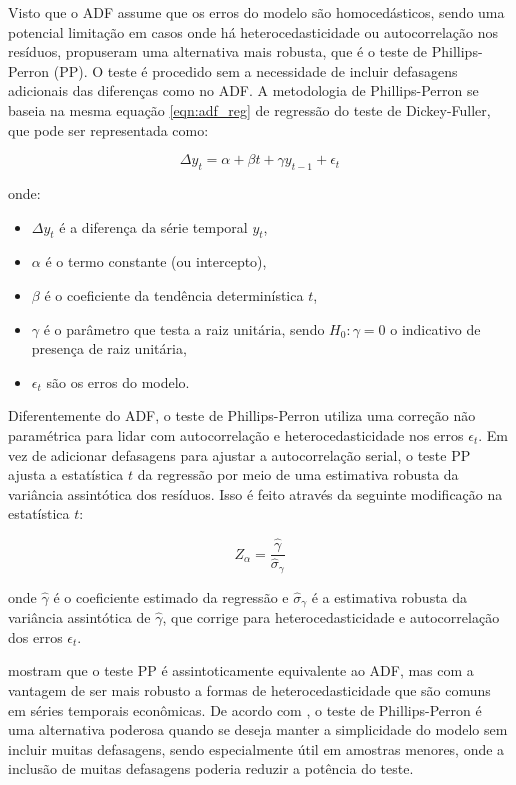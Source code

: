 \documentclass[12pt,oneside,a4paper,chapter=TITLE,english,brazil,sumario=abnt-6027-2012]{abntex2}
\begin{document}
Visto que o ADF assume que os erros do modelo são homocedásticos, sendo uma potencial limitação em casos onde há heterocedasticidade ou autocorrelação nos resíduos,  propuseram uma alternativa mais robusta, que é o teste de Phillips-Perron (PP). O teste é procedido sem a necessidade de incluir defasagens adicionais das diferenças como no ADF. A metodologia de Phillips-Perron se baseia na mesma equação \ref{eqn:adf_reg} de regressão do teste de Dickey-Fuller, que pode ser representada como:

\begin{equation}
	\label{eqn:adf_reg}
	\Delta y_t = \alpha + \beta t + \gamma y_{t-1} + \epsilon_t
\end{equation}

onde:

\begin{itemize}
	\item \( \Delta y_t \) é a diferença da série temporal \( y_t \),
	\item \( \alpha \) é o termo constante (ou intercepto),
	\item \( \beta \) é o coeficiente da tendência determinística \( t \),
	\item \( \gamma \) é o parâmetro que testa a raiz unitária, sendo \( H_0: \gamma = 0 \) o indicativo de presença de raiz unitária,
	\item \( \epsilon_t \) são os erros do modelo.
\end{itemize}

Diferentemente do ADF, o teste de Phillips-Perron utiliza uma correção não paramétrica para lidar com autocorrelação e heterocedasticidade nos erros \( \epsilon_t \). Em vez de adicionar defasagens para ajustar a autocorrelação serial, o teste PP ajusta a estatística \( t \) da regressão por meio de uma estimativa robusta da variância assintótica dos resíduos. Isso é feito através da seguinte modificação na estatística \( t \):

\begin{equation}
	Z_\alpha = \frac{\hat{\gamma}}{\widehat{\sigma}_{\gamma}}
\end{equation}

onde \( \hat{\gamma} \) é o coeficiente estimado da regressão e \( \widehat{\sigma}_{\gamma} \) é a estimativa robusta da variância assintótica de \( \hat{\gamma} \), que corrige para heterocedasticidade e autocorrelação dos erros \( \epsilon_t \).

 mostram que o teste PP é assintoticamente equivalente ao ADF, mas com a vantagem de ser mais robusto a formas de heterocedasticidade que são comuns em séries temporais econômicas. De acordo com , o teste de Phillips-Perron é uma alternativa poderosa quando se deseja manter a simplicidade do modelo sem incluir muitas defasagens, sendo especialmente útil em amostras menores, onde a inclusão de muitas defasagens poderia reduzir a potência do teste.
\end{document}
